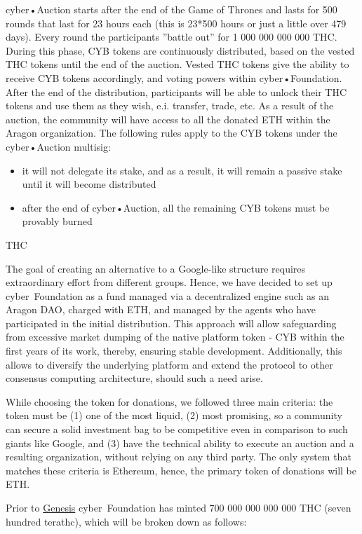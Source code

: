 \documentclass[8pt,oneside]{amsart}
\makeatletter
\renewcommand\subsection{\@startsection{subsection}
                                    {2}{\z@}
                                    {-3.25ex\@plus -1ex \@minus -.2ex}
                                    {0ex \@plus .2ex}
                                    {\play\Large}
                        }
\newcommand{\titleSection}[1]{\subsection{#1}}
\makeatother
\begin{document}
cyber•Auction starts after the end of the Game of Thrones and lasts for 500 rounds that last for 23 hours each (this is 23*500 hours or just a little over 479 days). Every round the participants ”battle out” for 1 000 000 000 000 THC. During this phase, CYB tokens are continuously distributed, based on the vested THC tokens until the end of the auction. Vested THC tokens give the ability to receive CYB tokens accordingly, and voting powers within cyber•Foundation. After the end of the distribution, participants will be able to unlock their THC tokens and use them as they wish, e.i. transfer, trade, etc. As a result of the auction, the community will have access to all the donated ETH within the Aragon organization. The following rules apply to the CYB tokens under the cyber•Auction multisig:

\begin{itemize}
\item it will not delegate its stake, and as a result, it will remain a passive stake until it will become distributed
\item after the end of cyber•Auction, all the remaining CYB tokens must be provably burned
\end{itemize}

\titleSection{THC}\label{THC}

The goal of creating an alternative to a Google-like structure requires extraordinary effort from different groups. Hence, we have decided to set up cyber~Foundation as a fund managed via a decentralized engine such as an Aragon DAO, charged with ETH, and managed by the agents who have participated in the initial distribution. This approach will allow safeguarding from excessive market dumping of the native platform token - CYB within the first years of its work, thereby, ensuring stable development. Additionally, this allows to diversify the underlying platform and extend the protocol to other consensus computing architecture, should such a need arise.

While choosing the token for donations, we followed three main criteria: the token must be (1) one of the most liquid, (2) most promising, so a community can secure a solid investment bag to be competitive even in comparison to such giants like Google, and (3) have the technical ability to execute an auction and a resulting organization, without relying on any third party. The only system that matches these criteria is Ethereum, hence, the primary token of donations will be ETH.

Prior to \hyperlink{genesis}{Genesis} cyber~Foundation has minted 700 000 000 000 000 THC (seven hundred terathc), which will be broken down as follows:
\end{document}
